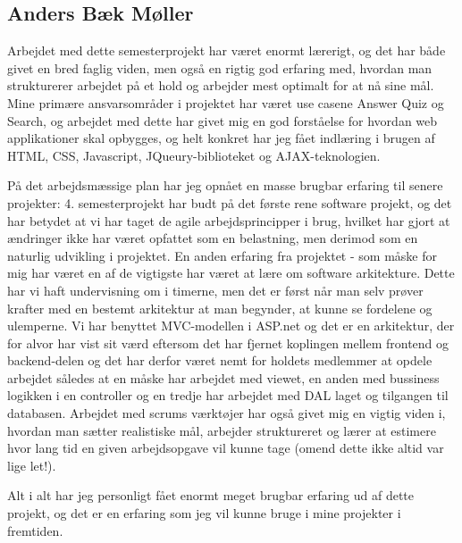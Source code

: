 \subsection*{Anders Bæk Møller}


Arbejdet med dette semesterprojekt har været enormt lærerigt, og det har både givet en bred faglig viden, men også en rigtig god erfaring med, hvordan man strukturerer arbejdet på et hold og arbejder mest optimalt for at nå sine mål. Mine primære ansvarsområder i projektet har været use casene Answer Quiz og Search, og arbejdet med dette har givet mig en god forståelse for hvordan web applikationer skal opbygges, og helt konkret har jeg fået indlæring i brugen af HTML, CSS, Javascript, JQueury-biblioteket og AJAX-teknologien. 

På det arbejdsmæssige plan har jeg opnået en masse brugbar erfaring til senere projekter: 4. semesterprojekt har budt på det første rene software projekt, og det har betydet at vi har taget de agile arbejdsprincipper i brug, hvilket har gjort at ændringer ikke har været opfattet som en belastning, men derimod som en naturlig udvikling i projektet. En anden erfaring fra projektet - som måske for mig har været en af de vigtigste har været at lære om software arkitekture. Dette har vi haft undervisning om i timerne, men det er først når man selv prøver krafter med en bestemt arkitektur at man begynder, at kunne se fordelene og ulemperne. Vi har benyttet MVC-modellen i ASP.net og det er en arkitektur, der for alvor har vist sit værd eftersom det har fjernet koplingen mellem frontend og backend-delen og det har derfor været nemt for holdets medlemmer at opdele arbejdet således at en måske har arbejdet med viewet, en anden med bussiness logikken i en controller og en tredje har arbejdet med DAL laget og tilgangen til databasen.
Arbejdet med scrums værktøjer har også givet mig en vigtig viden i, hvordan man sætter realistiske mål, arbejder struktureret og lærer at estimere hvor lang tid en given arbejdsopgave vil kunne tage (omend dette ikke altid var lige let!).


Alt i alt har jeg personligt fået enormt meget brugbar erfaring ud af dette projekt, og det er en erfaring som jeg vil kunne bruge i mine projekter i fremtiden.
